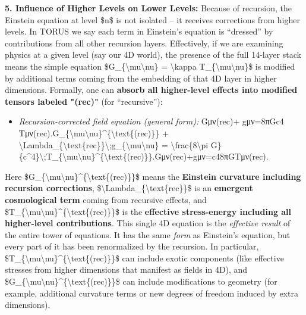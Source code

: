 \documentclass[
]{article}
\begin{document}
\textbf{5. Influence of Higher Levels on Lower Levels:} Because of
recursion, the Einstein equation at level \$n\$ is not isolated -- it
receives corrections from higher levels. In TORUS we say each term in
Einstein's equation is ``dressed'' by contributions from all other
recursion layers\hspace{0pt}. Effectively, if we are examining physics
at a given level (say our 4D world), the presence of the full 14-layer
stack means the simple equation
\$G\_\{\textbackslash mu\textbackslash nu\} = \textbackslash kappa
T\_\{\textbackslash mu\textbackslash nu\}\$ is modified by additional
terms coming from the embedding of that 4D layer in higher dimensions.
Formally, one can \textbf{absorb all higher-level effects into modified
tensors labeled "(rec)"} (for ``recursive'')\hspace{0pt}:

\begin{itemize}
\item
  \emph{Recursion-corrected field equation (general form):}
  Gμν(rec)+\Lambdarec  gμν=8πGc4  Tμν(rec).G\_\{\textbackslash mu\textbackslash nu\}\^{}\{\textbackslash text\{(rec)\}\}
  +
  \textbackslash Lambda\_\{\textbackslash text\{rec\}\}\textbackslash;g\_\{\textbackslash mu\textbackslash nu\}
  = \textbackslash frac\{8\textbackslash pi
  G\}\{c\^{}4\}\textbackslash;T\_\{\textbackslash mu\textbackslash nu\}\^{}\{\textbackslash text\{(rec)\}\}.Gμν(rec)\hspace{0pt}+\Lambdarec\hspace{0pt}gμν\hspace{0pt}=c48πG\hspace{0pt}Tμν(rec)\hspace{0pt}.
\end{itemize}

Here
\$G\_\{\textbackslash mu\textbackslash nu\}\^{}\{\textbackslash text\{(rec)\}\}\$
means the \textbf{Einstein curvature including recursion corrections},
\$\textbackslash Lambda\_\{\textbackslash text\{rec\}\}\$ is an
\textbf{emergent cosmological term} coming from recursive effects, and
\$T\_\{\textbackslash mu\textbackslash nu\}\^{}\{\textbackslash text\{(rec)\}\}\$
is the \textbf{effective stress-energy including all higher-level
contributions}\hspace{0pt}. This single 4D equation is the
\emph{effective result} of the entire tower of equations. It has the
same \emph{form} as Einstein's equation, but every part of it has been
renormalized by the recursion. In particular,
\$T\_\{\textbackslash mu\textbackslash nu\}\^{}\{\textbackslash text\{(rec)\}\}\$
can include exotic components (like effective stresses from higher
dimensions that manifest as fields in 4D), and
\$G\_\{\textbackslash mu\textbackslash nu\}\^{}\{\textbackslash text\{(rec)\}\}\$
can include modifications to geometry (for example, additional curvature
terms or new degrees of freedom induced by extra dimensions).
\end{document}
